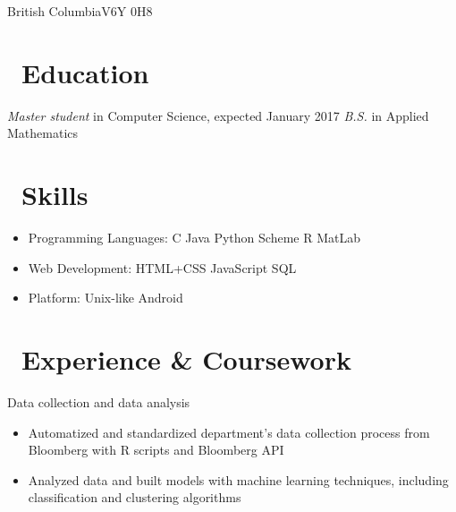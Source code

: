 \documentclass{resume}
\begin{document}


\address{7338 Gollner Ave, Richmond}{British Columbia}{V6Y 0H8}
 
\section{\texorpdfstring{\faGraduationCap}\ \ Education}
\textit{Master student} in Computer Science, expected January 2017
\textit{B.S.} in Applied Mathematics



\section{\texorpdfstring{\faCogs}\ \ Skills}
\begin{itemize}[parsep=0.5ex]
  \item Programming Languages: C Java Python Scheme R MatLab
  \item Web Development: HTML+CSS JavaScript SQL
  \item Platform: Unix-like Android
\end{itemize}



\section{\texorpdfstring{\faUsers}\ \ Experience \& Coursework}

Data collection and data analysis
\begin{itemize}
  \item Automatized and standardized department's data collection process from Bloomberg with R scripts and Bloomberg API
  \item Analyzed data and built models with machine learning techniques, including classification and clustering algorithms
\end{itemize}
\end{document}

